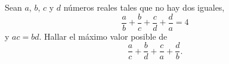 Sean $a$, $b$, $c$ y $d$ números reales tales que no hay dos iguales,
\[ \frac{a}{b}+ \frac{b}{c}+\frac{c}{d}+\frac{d}{a}=4 \]
y $ac=bd$. Hallar el máximo valor posible de
\[ \frac{a}{c}+\frac{b}{d}+\frac{c}{a}+\frac{d}{b}.\]
